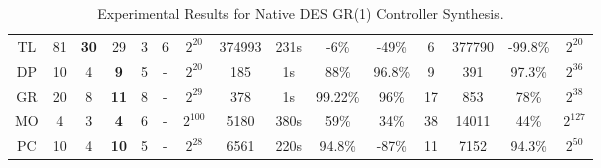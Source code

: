 \begin{table}[t]
{\begin{tabularx}{\textwidth}{|c|c|c|c|c|c|c|c|c|c|c|c|c|c|c|}
        TL & 81 & \textbf{30} & 29 & 3 & 6 & $2^{20}$ & 374993 & 231s & -6\% & -49\% & 6 & 377790 & -99.8\% & $2^{20}$\\ 
        \cline{1-15}

        
        DP & 10 & 4 & \textbf{9} & 5 & - & $2^{20}$ & 185 & 1s & 88\% & 96.8\% & 9 & 391 & 97.3\% & $2^{36}$ \\ \cline{1-15}

        GR & 20 & 8 & \textbf{11} & 8 & - & $2^{29}$ & 378 & 1s & 99.22\% & 96\% & 17 & 853 & 78\% & $2^{38}$ \\ 
        \cline{1-15}
        
        MO & 4 & 3 & \textbf{4} & 6 & - & $2^{100}$ & 5180 & 380s & 59\% & 34\% & 38 & 14011 & 44\% & $2^{127}$ \\ \cline{1-15}

        PC & 10 & 4 & \textbf{10} & 5 & - & $2^{28}$ & 6561 & 220s & 94.8\% & -87\% & 11 & 7152 & 94.3\% & $2^{50}$ \\ \cline{1-15}
        
    \end{tabularx}
    }
    \caption{Experimental Results for Native DES GR(1) Controller Synthesis.}
    \label{table:experimentation}
\label{tab:algorithm_experiment}
\end{table}
